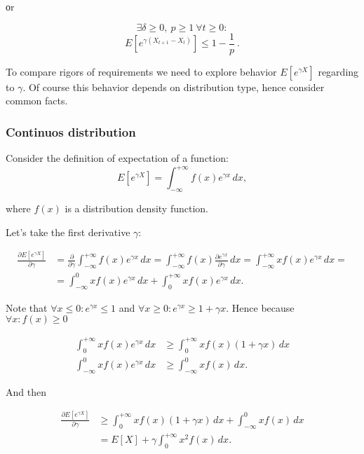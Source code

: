 \documentclass[12pt, a4paper]{article}
\theoremstyle{remark}
\begin{document}
оr

$$\exists \delta \geq 0,\ p \geq 1 \ \forall t \geq 0: $$$$
E\left[e^{\gamma (X_{t + 1} - X_{t})}\right] \leq 1 - \frac{1}{p}\ .$$


To compare rigors of requirements we need to explore behavior $E[e^{\gamma X}]$ regarding to $\gamma$. Of course this behavior depends on distribution type, hence consider common facts.   

\subsubsection*{Continuos distribution}

Consider the definition of expectation of a function:
\[
E[e^{\gamma X}] = \int_{-\infty}^{+\infty} f(x) e^{\gamma x} \,dx,    
\]

where $f(x)$ is a distribution density function.

\hfill

Let's take the first derivative $\gamma$:

\begin{align*}
\frac{\partial E[e^{\gamma X}]}{\partial \gamma} &= \frac{\partial}{\partial \gamma} \int_{-\infty}^{+\infty} f(x) e^{\gamma x} \, dx = \int_{-\infty}^{+\infty} f(x) \frac{\partial e^{\gamma x}}{\partial \gamma} \, dx = \int_{-\infty}^{+\infty} x f(x) e^{\gamma x} \, dx = \\
&= \int_{-\infty}^{0} x f(x) e^{\gamma x} \, dx + \int_{0}^{+\infty} x f(x) e^{\gamma x} \, dx.
\end{align*}

Note that $\forall x \leq 0 : e^{\gamma x} \leq 1$ and $\forall x \geq 0 : e^{\gamma x} \geq 1 + \gamma x$. Hence because $\forall x : f(x) \geq 0$ 

\begin{align*}
    \int_{0}^{+\infty} x f(x) e^{\gamma x} \, dx &\geq \int_{0}^{+\infty} x f(x) (1 + \gamma x)\, dx    \\
    \int_{-\infty}^{0} x f(x) e^{\gamma x} \, dx &\geq \int_{-\infty}^{0} x f(x)\, dx.    
\end{align*}

And then

\begin{align*}
\frac{\partial E[e^{\gamma X}]}{\partial \gamma} &\geq  \int_{0}^{+\infty} x f(x) (1 + \gamma x)\, dx + \int_{-\infty}^{0} x f(x)\, dx  \\
&= E[X] + \gamma \int_{0}^{+\infty} x^2 f(x) \, dx.
\end{align*}
\end{document}
